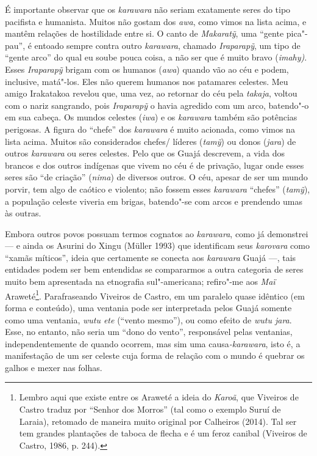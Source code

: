 É importante observar que os \emph{karawara} não seriam exatamente seres
do tipo pacifista e humanista. Muitos não gostam dos \emph{awa}, como
vimos na lista acima, e mantêm relações de hostilidade entre si. O canto
de \emph{Makaratỹ}, uma ``gente pica"-pau'', é entoado sempre contra
outro \emph{karawara}, chamado \emph{Iraparapỹ}, um tipo de ``gente
arco'' do qual eu soube pouca coisa, a não ser que é muito bravo
(\emph{imahy)}. Esses \emph{Iraparapỹ} brigam com os humanos
(\emph{awa}) quando vão ao céu e podem, inclusive, matá"-los. Eles não
querem humanos nos patamares celestes. Meu amigo Irakatakoa revelou que,
uma vez, ao retornar do céu pela \emph{takaja}, voltou com o nariz
sangrando, pois \emph{Iraparapỹ} o havia agredido com um arco, batendo"-o
em sua cabeça. Os mundos celestes (\emph{iwa}) e os \emph{karawara}
também são potências perigosas. A figura do ``chefe'' dos
\emph{karawara} é muito acionada, como vimos na lista acima. Muitos são
considerados chefes/ líderes (\emph{tamỹ}) ou donos (\emph{jara}) de
outros \emph{karawara} ou seres celestes. Pelo que os Guajá descrevem, a
vida dos brancos e dos outros indígenas que vivem no céu é de privação,
lugar onde esses seres são ``de criação'' (\emph{nima}) de diversos
outros. O céu, apesar de ser um mundo porvir, tem algo de caótico e
violento; não fossem esses \emph{karawara} ``chefes'' (\emph{tamỹ}), a
população celeste viveria em brigas, batendo"-se com arcos e prendendo
umas às outras.

Embora outros povos possuam termos cognatos ao \emph{karawara}, como já
demonstrei --- e ainda os Asurini do Xingu (Müller 1993) que identificam
seus \emph{karovara} como ``xamãs míticos'', ideia que certamente se
conecta aos \emph{karawara} Guajá ---, tais entidades podem ser bem
entendidas se compararmos a outra categoria de seres muito bem
apresentada na etnografia sul"-americana; refiro"-me aos \emph{Maï}
Araweté\footnote{Lembro aqui que existe entre os Araweté a ideia do
  \emph{Karoã}, que Viveiros de Castro traduz por ``Senhor dos Morros''
  (tal como o exemplo Suruí de Laraia), retomado de maneira muito
  original por Calheiros (2014). Tal ser tem grandes plantações de
  taboca de flecha e é um feroz canibal (Viveiros de Castro, 1986, p.
  244).}. Parafraseando Viveiros de Castro, em um paralelo quase
idêntico (em forma e conteúdo), uma ventania pode ser interpretada pelos
Guajá somente como uma ventania, \emph{wutu ete} (``vento mesmo''), ou
como efeito de \emph{wutu jara}. Esse, no entanto, não seria um ``dono do
vento'', responsável pelas ventanias, independentemente de quando
ocorrem, mas sim uma causa\emph{-karawara}, isto é, a manifestação de um
ser celeste cuja forma de relação com o mundo é quebrar os galhos e
mexer nas folhas.

